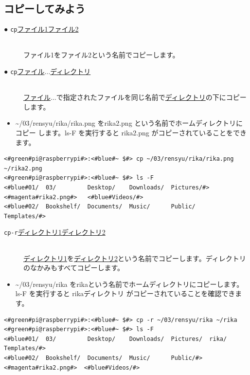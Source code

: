 \documentclass[text03.tex]{subfiles}
\begin{document}
\subsection{コピーしてみよう}
\begin{description}
    \item[● \texttt{cp}\textvisiblespace \underline{ファイル1}\textvisiblespace \underline{ファイル2}]\mbox{}\\
    ファイル1をファイル2という名前でコピーします。
    \item[● \texttt{cp}\textvisiblespace \underline{ファイル}$\ldots$\textvisiblespace \underline{ディレクトリ}]\mbox{}\\
    \underline{ファイル}$\ldots$で指定されたファイルを同じ名前で\underline{ディレクトリ}の下にコピーします。
\end{description}
\begin{itemize}
\item[<例>]\textasciitilde /03/rensyu/rika/rika.png をrika2.png という名前でホームディレクトリにコピー
します。ls\textvisiblespace -F を実行すると rika2.png がコピーされていることをできます。
\end{itemize}
\begin{lstlisting}[caption=cpの例, label=cp]
<#green#pi@raspberrypi#>:<#blue#~ $#> cp ~/03/rensyu/rika/rika.png ~/rika2.png
<#green#pi@raspberrypi#>:<#blue#~ $#> ls -F
<#blue#01/  03/         Desktop/    Downloads/  Pictures/#>  <#magenta#rika2.png#>   <#blue#Videos/#>
<#blue#02/  Bookshelf/  Documents/  Music/      Public/    Templates/#>
\end{lstlisting}
\begin{description}
\item[\texttt{cp}\textvisiblespace \texttt{-r}\textvisiblespace \underline{ディレクトリ1}\textvisiblespace \underline{ディレクトリ2}]\mbox{}\\
\underline{ディレクトリ1}を\underline{ディレクトリ2}という名前でコピーします。ディレクトリのなかみもすべてコピーします。
\end{description}
\begin{itemize}
\item[<例>]\textasciitilde /03/rensyu/rika をrikaという名前でホームディレクトリにコピーします。ls\textvisiblespace -F を実行すると rikaディレクトリ がコピーされていることを確認できます。
\end{itemize}
\begin{lstlisting}[caption=cp -rの例, label=cp-R]
<#green#pi@raspberrypi#>:<#blue#~ $#> cp -r ~/03/rensyu/rika ~/rika
<#green#pi@raspberrypi#>:<#blue#~ $#> ls -F
<#blue#01/  03/         Desktop/    Downloads/  Pictures/  rika/      Templates/#>
<#blue#02/  Bookshelf/  Documents/  Music/      Public/#>    <#magenta#rika2.png#>  <#blue#Videos/#>
\end{lstlisting}
\end{document}
